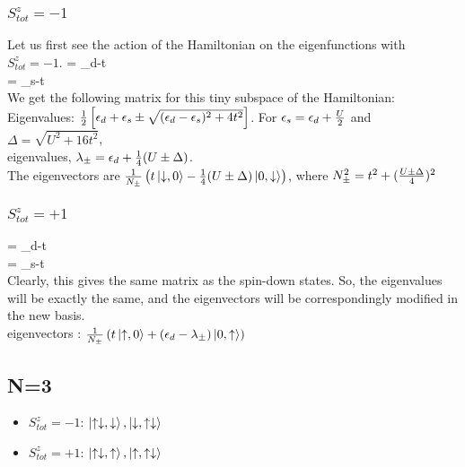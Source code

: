\documentclass[12pt]{article}
\begin{document}
\subsubsection{\(S_{tot}^z = -1\)}
Let us first see the action of the Hamiltonian on the eigenfunctions with \(S_{tot}^z = -1\).
\beq
\ham{} = \epsilon_d-t \\
\ham{} = \epsilon_s-t \\
\eeq
We get the following matrix for this tiny subspace of the Hamiltonian:
\beq
{}
\eeq
Eigenvalues: \(\frac{1}{2}\left[{\epsilon_d+\epsilon_s \pm \sqrt{(\epsilon_d-\epsilon_s)^2+4t^2}}\right]\). For \(\epsilon_s = \epsilon_d + \frac{U}{2}\) and \(\Delta = \sqrt{U^2+16t^2}\), \\ eigenvalues, \(\lambda_\pm = \epsilon_d + \frac{1}{4}(U\pm\Delta)\). \\
The eigenvectors are \(\frac{1}{N_\pm}\left({t\ket{\downarrow,0}-\frac{1}{4}(U\pm\Delta)\ket{0,\downarrow}}\right)\), where \(N_\pm^2 = t^2 + (\frac{U\pm\Delta}{4})^2\)
\subsubsection{\(S_{tot}^z = +1\)}
\beq
\ham{} = \epsilon_d-t \\
\ham{} = \epsilon_s-t \\
\eeq
Clearly, this gives the same matrix as the spin-down states. So, the eigenvalues will be exactly the same, and the eigenvectors will be correspondingly modified in the new basis. \\
eigenvectors : \(\frac{1}{N_\pm}\left({t\ket{\uparrow,0}+(\epsilon_d-\lambda_\pm)\ket{0,\uparrow}}\right)\)
\subsection{N=3}
\begin{itemize}
\item \(S_{tot}^z = -1\): \(\ket{\uparrow\downarrow,\downarrow}, \ket{\downarrow,\uparrow\downarrow}\)
\item \(S_{tot}^z = +1\): \(\ket{\uparrow\downarrow,\uparrow}, \ket{\uparrow,\uparrow\downarrow}\)
\end{itemize}
\end{document}
